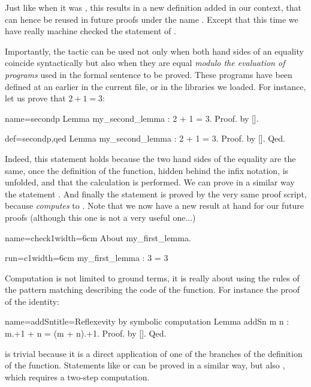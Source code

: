 Just like when it was , this results in a new definition
added in our context, that can hence be reused in future proofs under
the name . Except that this time we have really
machine checked the statement of .


Importantly, the  tactic can be used not only when both
hand sides of an equality coincide syntactically but also when they are
equal \emph{modulo the evaluation of programs} used in the formal
sentence to be proved. These programs have been defined at an
earlier in the current file, or in the libraries
we loaded. For instance, let us prove that $2 + 1 = 3$:

\begin{coqdef}{name=secondp}
Lemma my_second_lemma : 2 + 1 = 3.
Proof. by [].
\end{coqdef}
\begin{coq}{def=secondp,qed}{}
Lemma my_second_lemma : 2 + 1 = 3.
Proof. by []. Qed.
\end{coq}


Indeed, this statement holds because the two hand sides of the equality
are the same, once the definition of the  function, hidden
behind the infix \C{+} notation, is unfolded, and that the calculation
is performed. We can prove in a similar way the statement . And finally the statement  is proved by the very same
proof script, because  \emph{computes} to
.
Note that we now have a new result at hand for our future proofs
(although this one is not a very useful one...)

\begin{coq}{name=check1}{width=6cm}
About my_first_lemma.
\end{coq}
\begin{coqout}{run=c1}{width=6cm}
my_first_lemma : 3 = 3
\end{coqout}

Computation is not limited to ground terms, it is really about using
the rules of the pattern matching describing the code of the
function. 
For instance the proof of the  identity:


\begin{coq}{name=addSn}{title=Reflexevity by symbolic computation}
Lemma addSn m n : m.+1 + n = (m + n).+1. Proof. by []. Qed.
\end{coq}
is trivial because it is a direct application of one of the branches
of the definition of the  function. Statements like
 or  can be proved in a similar way, but
also , which requires a two-step computation.

